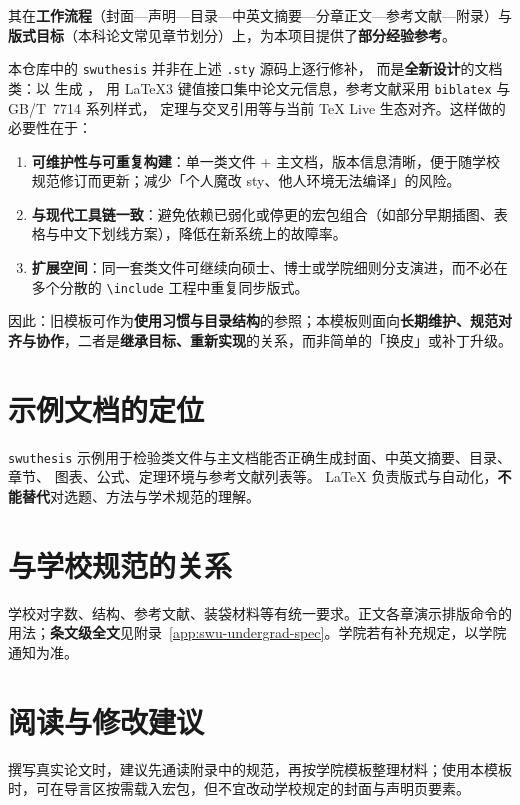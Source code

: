 其在\textbf{工作流程}（封面—声明—目录—中英文摘要—分章正文—参考文献—附录）与\textbf{版式目标}（本科论文常见章节划分）上，为本项目提供了\textbf{部分经验参考}。

本仓库中的 \texttt{swuthesis} 并非在上述 \texttt{.sty} 源码上逐行修补，%
而是\textbf{全新设计}的文档类：以  生成 ，%
用 \LaTeX3 键值接口集中论文元信息，参考文献采用 \texttt{biblatex} 与 GB/T~7714 系列样式，%
定理与交叉引用等与当前 \TeX{} Live 生态对齐。这样做的必要性在于：
\begin{enumerate}[label=\arabic*., leftmargin=2em]
  \item \textbf{可维护性与可重复构建}：单一类文件 + 主文档，版本信息清晰，便于随学校规范修订而更新；减少「个人魔改 sty、他人环境无法编译」的风险。
  \item \textbf{与现代工具链一致}：避免依赖已弱化或停更的宏包组合（如部分早期插图、表格与中文下划线方案），降低在新系统上的故障率。
  \item \textbf{扩展空间}：同一套类文件可继续向硕士、博士或学院细则分支演进，而不必在多个分散的 \texttt{\textbackslash include} 工程中重复同步版式。
\end{enumerate}
因此：旧模板可作为\textbf{使用习惯与目录结构}的参照；本模板则面向\textbf{长期维护、规范对齐与协作}，二者是\textbf{继承目标、重新实现}的关系，而非简单的「换皮」或补丁升级。

\section{示例文档的定位}
\texttt{swuthesis} 示例用于检验类文件与主文档能否正确生成封面、中英文摘要、目录、章节、%
图表、公式、定理环境与参考文献列表等。%
\LaTeX{} 负责版式与自动化，\textbf{不能替代}对选题、方法与学术规范的理解。

\section{与学校规范的关系}
学校对字数、结构、参考文献、装袋材料等有统一要求。正文各章演示排版命令的用法；\textbf{条文级全文}见附录~\ref{app:swu-undergrad-spec}。学院若有补充规定，以学院通知为准。

\section{阅读与修改建议}
撰写真实论文时，建议先通读附录中的规范，再按学院模板整理材料；使用本模板时，可在导言区按需载入宏包，但不宜改动学校规定的封面与声明页要素。

